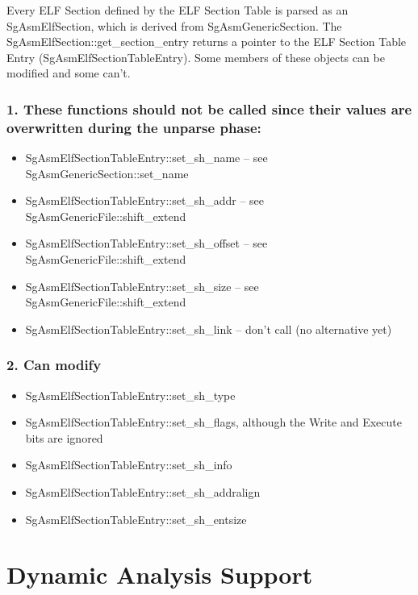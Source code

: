 Every ELF Section defined by the ELF Section Table is parsed as an SgAsmElfSection, which is derived from SgAsmGenericSection.
The SgAsmElfSection::get\_section\_entry returns a pointer to the ELF Section Table Entry (SgAsmElfSectionTableEntry). Some
members of these objects can be modified and some can't.

\subsubsection{1. These functions should not be called since their values are overwritten during the unparse phase:}

\begin{itemize}
   \item SgAsmElfSectionTableEntry::set\_sh\_name   -- see SgAsmGenericSection::set\_name
   \item SgAsmElfSectionTableEntry::set\_sh\_addr   -- see SgAsmGenericFile::shift\_extend
   \item SgAsmElfSectionTableEntry::set\_sh\_offset -- see SgAsmGenericFile::shift\_extend
   \item SgAsmElfSectionTableEntry::set\_sh\_size   -- see SgAsmGenericFile::shift\_extend
   \item SgAsmElfSectionTableEntry::set\_sh\_link   -- don't call (no alternative yet)
\end{itemize}
   
\subsubsection{2. Can modify}


\begin{itemize}
   \item SgAsmElfSectionTableEntry::set\_sh\_type
   \item SgAsmElfSectionTableEntry::set\_sh\_flags, although the Write and Execute bits are ignored
   \item SgAsmElfSectionTableEntry::set\_sh\_info      
   \item SgAsmElfSectionTableEntry::set\_sh\_addralign 
   \item SgAsmElfSectionTableEntry::set\_sh\_entsize   
\end{itemize}


\section{Dynamic Analysis Support}
\label{intel_pin}

